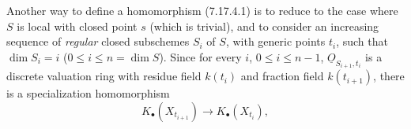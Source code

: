 Another way to define a homomorphism (7.17.4.1) is to reduce to the case where \(S\) is local with closed point \(s\) (which is trivial), and to consider an increasing sequence of \emph{regular} closed subschemes \(S_i\) of \(S\), with generic points \(t_i\), such that \(\dim S_i=i\) (\(0\leq i\leq n=\dim S\)). Since for every \(i\), \(0\leq i\leq n-1\), \(\underline{O}_{S_{i+1},t_i}\) is a discrete valuation ring with residue field \(k(t_i)\) and fraction field \(k(t_{i+1})\), there is a specialization homomorphism
\[
  K_\bullet(X_{t_{i+1}})\longrightarrow K_\bullet(X_{t_i}),
\]
